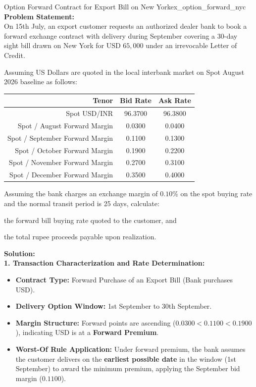 \begin{example}{Option Forward Contract for Export Bill on New York}{ex_option_forward_nyc}
\textbf{Problem Statement:}\\
On 15th July, an export customer requests an authorized dealer bank to book a forward exchange contract with delivery during September covering a 30-day sight bill drawn on New York for $\text{USD } 65{,}000$ under an irrevocable Letter of Credit.

Assuming US Dollars are quoted in the local interbank market on Spot August 2026 baseline as follows:
\begin{center}
\begin{tabular}{rcc}
    \toprule
    \textbf{Tenor} & \textbf{Bid Rate} & \textbf{Ask Rate} \\
    \midrule
    Spot USD/INR & 96.3700 & 96.3800 \\
    Spot / August Forward Margin & 0.0300 & 0.0400 \\
    Spot / September Forward Margin & 0.1100 & 0.1300 \\
    Spot / October Forward Margin & 0.1900 & 0.2200 \\
    Spot / November Forward Margin & 0.2700 & 0.3100 \\
    Spot / December Forward Margin & 0.3500 & 0.4000 \\
    \bottomrule
\end{tabular}
\end{center}
Assuming the bank charges an exchange margin of $0.10\%$ on the spot buying rate and the normal transit period is 25 days, calculate:
\begin{enumerate*}[label=(\roman*)]
    \item the forward bill buying rate quoted to the customer, and
    \item the total rupee proceeds payable upon realization.
\end{enumerate*}

\tcblower
\textbf{Solution:}\\
\noindent\textbf{1. Transaction Characterization and Rate Determination:}
\begin{itemize}[leftmargin=*, noitemsep]
    \item \textbf{Contract Type:} Forward Purchase of an Export Bill (Bank purchases USD).
    \item \textbf{Delivery Option Window:} 1st September to 30th September.
    \item \textbf{Margin Structure:} Forward points are ascending ($0.0300 < 0.1100 < 0.1900$), indicating USD is at a \textbf{Forward Premium}.
    \item \textbf{Worst-Of Rule Application:} Under forward premium, the bank assumes the customer delivers on the \textbf{earliest possible date} in the window (1st September) to award the minimum premium, applying the September bid margin ($0.1100$).
\end{itemize}


\end{example}
